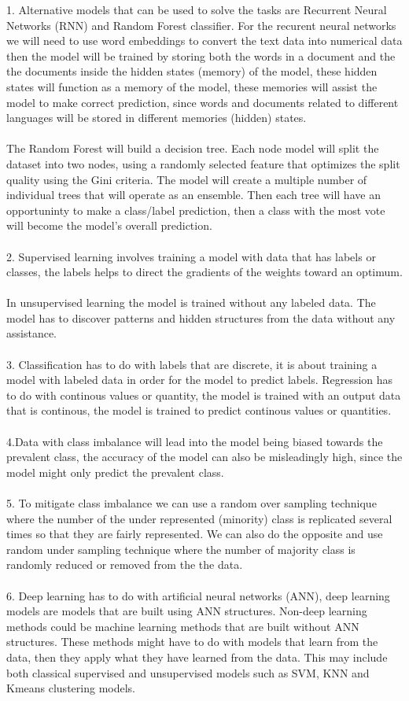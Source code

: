 \documentclass[12pt,a4paper]{article}
\begin{document}
1.  Alternative models that can be used to solve the tasks are Recurrent Neural Networks (RNN) and Random Forest classifier. For the recurent neural networks we will need to use word embeddings to convert the text data into numerical data then the model will be trained by storing both the words in a document and the the documents inside the hidden states (memory) of the model, these hidden states will function as a memory of the model, these memories will assist the model to make correct prediction, since words and documents related to different languages will be stored in different memories (hidden) states.  \\
\\
The Random Forest will build a decision tree. Each node model will split the dataset into two nodes, using a randomly selected feature that optimizes the split quality using the Gini criteria. The model will create a multiple number of individual trees that will operate as an ensemble. Then each tree will have an opportuninty to make a class/label prediction, then a class with the most vote will become the model's overall prediction.\\
\\
2. Supervised learning involves training a model with data that has labels or classes, the labels helps to direct the gradients of the weights toward an optimum.\\
\\
\noindent In unsupervised learning the model is trained without any labeled data. The model has to discover patterns and hidden structures from the data without any assistance.\\
\\
3. Classification has to do with labels that are discrete, it is about training a model with labeled data in order for the model to predict labels. Regression has to do with continous values or quantity, the model is trained with an output data that is continous, the model is trained to predict continous values or quantities.\\
\\
4.Data with class imbalance will lead into the model being biased towards the prevalent class, the accuracy of the model can also be misleadingly high, since the model might only predict the prevalent class.\\
\\
5. To mitigate class imbalance we can use a random over sampling technique where the number of the under represented (minority) class is replicated several times so that they are fairly represented. We can also do the opposite and use random under sampling technique where the number of majority class is randomly reduced or removed from the the data.\\
\\
6. Deep learning has to do with artificial neural networks (ANN), deep learning models are models that are built using ANN structures. Non-deep learning methods could be machine learning methods that are built without ANN structures. These methods might have  to do with models that learn from the data, then they apply what they have learned from the data. This may include both classical supervised and unsupervised models such as SVM, KNN and Kmeans clustering models. 
\end{document}
